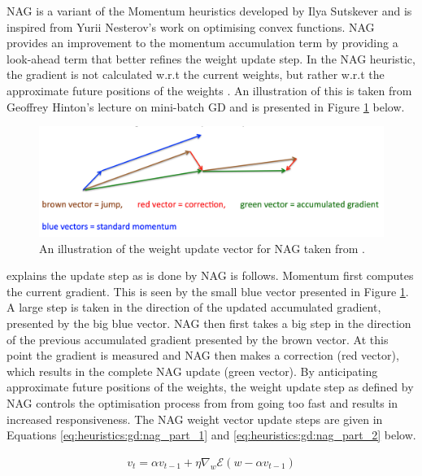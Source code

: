 \Acl{NAG} is a variant of the \ac{Momentum} heuristics developed by Ilya Sutskever \cite{ref:sutskever:2013-2} and is inspired from Yurii Nesterov's \cite{ref:nesterov:1983} work on optimising convex functions. \ac{NAG} provides an improvement to the momentum accumulation term by providing a look-ahead term that better refines the weight update step. In the \ac{NAG} heuristic, the gradient is not calculated w.r.t the current weights, but rather w.r.t the approximate future positions of the weights \cite{ref:ruder:2016}. An illustration of this is taken from Geoffrey Hinton's lecture on mini-batch \ac{GD} \cite{ref:hinton:2012} and is presented in Figure \ref{fig:heuristics:gd:nag} below.

\begin{figure}[htbp]
    \includegraphics[width=\textwidth]{images/nag.png}
    \caption{An illustration of the weight update vector for \ac{NAG} taken from \cite{ref:hinton:2012}.}
    \label{fig:heuristics:gd:nag}
\end{figure}


\citeauthor{ref:ruder:2016} \cite{ref:ruder:2016} explains the update step as is done by \ac{NAG} is follows. \ac{Momentum} first computes the current gradient. This is seen by the small blue vector presented in Figure \ref{fig:heuristics:gd:nag}. A large step is taken in the direction of the updated accumulated gradient, presented by the big blue vector. \ac{NAG} then first takes a big step in the direction of the previous accumulated gradient presented by the brown vector. At this point the gradient is measured and \ac{NAG} then makes a correction (red vector), which results in the complete NAG update (green vector). By anticipating approximate future positions of the weights, the weight update step as defined by \ac{NAG} controls the optimisation process from from going too fast and results in increased responsiveness. The \ac{NAG} weight vector update steps are given in Equations \ref{eq:heuristics:gd:nag_part_1} and \ref{eq:heuristics:gd:nag_part_2} below.

\begin{equation}
    \label{eq:heuristics:gd:nag_part_1}
    \begin{split}
        v_{t} = \alpha v_{t-1} + \eta \nabla_{w}\mathcal{E}(w - \alpha v_{t-1})
    \end{split}
\end{equation}

